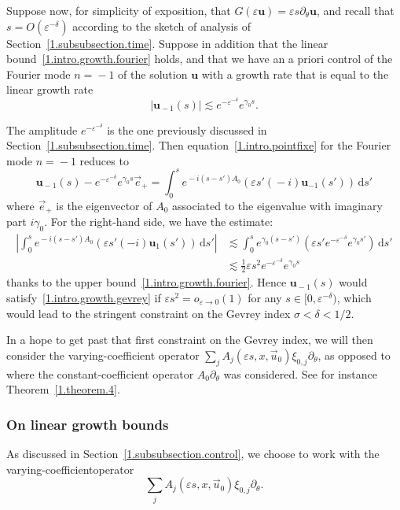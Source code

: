 \documentclass[AHL,Unicode,longabstracts,published]{cedram}
\theoremstyle{plain}
\newcommand*\e{\varepsilon}
\newcommand{\dptl}{\partial}%
\newcommand*\g{\gamma}
\newcommand{\ubf}{{\mathbf u}}
\newcommand{\rmd}{\mathrm{d}}
\begin{document}
Suppose now, for simplicity of exposition, that $G(\e \ubf) = \e s \dptl_{\theta} \ubf$, and recall that $s = O(\e^{-\delta})$ according to the sketch of analysis of Section~\ref{1.subsubsection.time}. Suppose in addition that the linear bound~\eqref{1.intro.growth.fourier} holds, and that we have an a priori control of the Fourier mode $n={}-1$ of the solution $\ubf$ with a growth rate that is equal to the linear growth rate
\[
|\ubf_{{}-1}(s)| \lesssim e^{-\e^{-\delta}} e^{\g_0 s}.
\]


The amplitude $e^{-\e^{-\delta}}$ is the one previously discussed in Section~\ref{1.subsubsection.time}. Then equation~\eqref{1.intro.pointfixe} for the Fourier mode $n={}-1$ reduces to
\[
\ubf_{{}-1}(s) - e^{-\e^{-\delta}}e^{\g_0 s}\vec{e}_{+} = \int_{0}^{s} e^{{}-i(s-s')A_0} \left(\e s' ({}-i) \ubf_{-1}(s')\right) \,{\rmd}s'
\]
where $\vec{e}_{+}$ is the eigenvector of $A_0$ associated to the eigenvalue with imaginary part $i\g_0$. For the right-hand side, we have the estimate:
\begin{align}
\left| \int_{0}^{s} e^{{}-i(s-s')A_0} \left(\e s' (-i) \ubf_1(s')\right) \,{\rmd}s' \right| & \lesssim \int_{0}^{s} e^{\g_0(s-s')} \left(\e s' e^{-\e^{-\delta}} e^{\g_0 s'}\right) \,{\rmd}s' \nonumber \\
& \lesssim \frac{1}{2} \e s^2 e^{-\e^{-\delta}}e^{\g_0 s} \label{1.intro.computation}
\end{align}
thanks to the upper bound~\eqref{1.intro.growth.fourier}. Hence $\ubf_{{}-1}(s)$ would satisfy~\eqref{1.intro.growth.gevrey} if $ \e s^2 = o_{\e\to0}(1) $ for any $s\in[0,\e^{-\delta})$, which would lead to the stringent constraint on the Gevrey index $ \sigma < \delta < 1/2 $.

In a hope to get past that first constraint on the Gevrey index, we will then consider the varying-coefficient operator $\sum_j A_j(\e s, x,
\vec{u}_0)\xi_{0,j} \dptl_{\theta}$, as opposed to~\cite{metivier2005remarks} where the constant-coefficient operator $A_0 \dptl_{\theta}$ was considered. See for instance Theorem~\ref{1.theorem.4}.


\subsubsection{On linear growth bounds}\label{1.intro.section.bounds}

As discussed in Section~\ref{1.subsubsection.control}, we choose to work with the varying-coefficient\linebreak operator
\[
\sum_j A_j(\e s, x, \vec{u}_0)\xi_{0,j} \dptl_{\theta}.
\]
\end{document}
